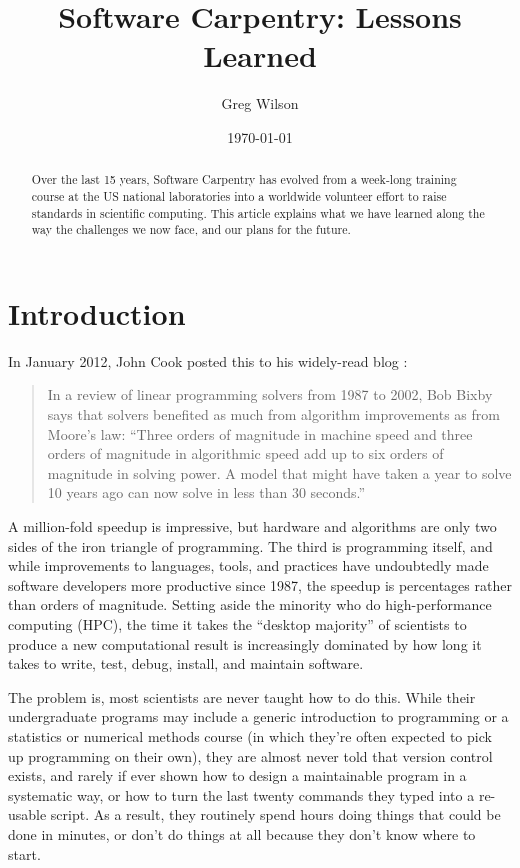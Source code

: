 \documentclass{article}
\title{Software Carpentry: Lessons Learned}
\date{\today}
\author[a]{Greg Wilson}
\affil[a]{Mozilla Foundation / gvwilson@software-carpentry.org}
\begin{document}
\maketitle

\begin{abstract}

Over the last 15 years, Software Carpentry has evolved from a week-long
training course at the US national laboratories into a worldwide
volunteer effort to raise standards in scientific computing. This
article explains what we have learned along the way the challenges we
now face, and our plans for the future.

\end{abstract}

\section{Introduction}

In January 2012, John Cook posted this to his widely-read blog
\cite{cook2012}:

\begin{quote}
In a review of linear programming solvers from 1987 to 2002, Bob Bixby
says that solvers benefited as much from algorithm improvements as from
Moore's law: ``Three orders of magnitude in machine speed and three
orders of magnitude in algorithmic speed add up to six orders of
magnitude in solving power. A model that might have taken a year to
solve 10 years ago can now solve in less than 30 seconds.''
\end{quote}

A million-fold speedup is impressive, but hardware and algorithms are
only two sides of the iron triangle of programming. The third is
programming itself, and while improvements to languages, tools, and
practices have undoubtedly made software developers more productive
since 1987, the speedup is percentages rather than orders of magnitude.
Setting aside the minority who do high-performance computing (HPC), the
time it takes the ``desktop majority'' of scientists to produce a new
computational result is increasingly dominated by how long it takes to
write, test, debug, install, and maintain software.

The problem is, most scientists are never taught how to do this. While
their undergraduate programs may include a generic introduction to
programming or a statistics or numerical methods course (in which
they're often expected to pick up programming on their own), they are
almost never told that version control exists, and rarely if ever shown
how to design a maintainable program in a systematic way, or how to turn
the last twenty commands they typed into a re-usable script. As a
result, they routinely spend hours doing things that could be done in
minutes, or don't do things at all because they don't know where to
start.
\end{document}
